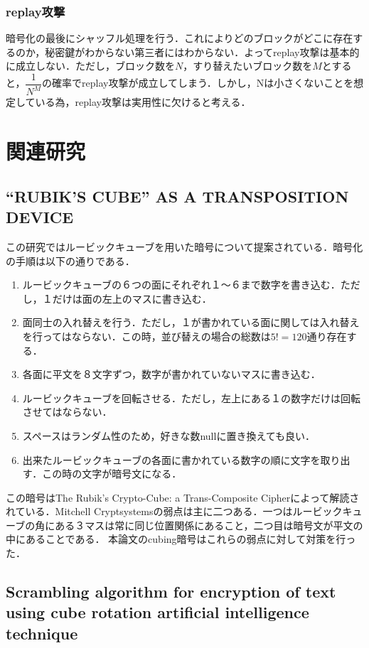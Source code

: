 \documentclass[a4p]{jarticle}
\begin{document}
\subsubsection{replay攻撃}
暗号化の最後にシャッフル処理を行う．これによりどのブロックがどこに存在するのか，秘密鍵がわからない第三者にはわからない．よってreplay攻撃は基本的に成立しない．ただし，ブロック数を$N$，すり替えたいブロック数を$M$とすると，$\dfrac{1}{N^M}$の確率でreplay攻撃が成立してしまう．しかし，Nは小さくないことを想定している為，replay攻撃は実用性に欠けると考える．

\section{関連研究}
\subsection{“RUBIK'S CUBE” AS A TRANSPOSITION DEVICE}
この研究ではルービックキューブを用いた暗号について提案されている．\cite{Mitchell}暗号化の手順は以下の通りである．
\begin{enumerate}
  \item ルービックキューブの６つの面にそれぞれ１〜６まで数字を書き込む．ただし，１だけは面の左上のマスに書き込む．
  \item 面同士の入れ替えを行う．ただし，１が書かれている面に関しては入れ替えを行ってはならない．この時，並び替えの場合の総数は$5!=120$通り存在する．
  \item 各面に平文を８文字ずつ，数字が書かれていないマスに書き込む．
  \item ルービックキューブを回転させる．ただし，左上にある１の数字だけは回転させてはならない．
  \item スペースはランダム性のため，好きな数nullに置き換えても良い．
  \item 出来たルービックキューブの各面に書かれている数字の順に文字を取り出す．この時の文字が暗号文になる．
\end{enumerate}

この暗号はThe Rubik's Crypto-Cube: a Trans-Composite Cipher\cite{Trans-Composite Cipher}によって解読されている．Mitchell Cryptsystemsの弱点は主に二つある．一つはルービックキューブの角にある３マスは常に同じ位置関係にあること，二つ目は暗号文が平文の中にあることである．
本論文のcubing暗号はこれらの弱点に対して対策を行った．


\subsection{Scrambling algorithm for encryption of text using cube rotation artificial intelligence technique}
\end{document}
